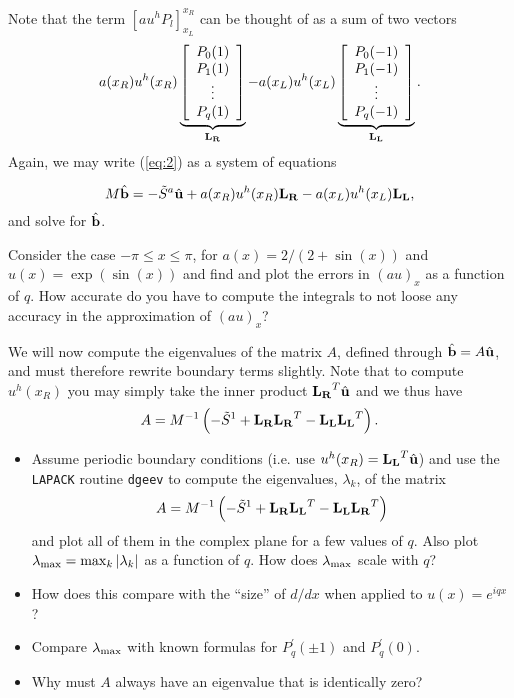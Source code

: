 \documentclass[12pt]{article}
\newcommand{\be}{\begin{equation}}
\newcommand{\ee}{\end{equation}}
\begin{document}
Note that the term $\left[au^h P_l  \right]_{x_L}^{x_R}$ can be thought of as a sum of two vectors  
\[
a(x_R) u^h(x_R) \underbrace{\left[ \begin{array}{c}
P_0(1)\\
P_1(1)\\
\vdots \\
P_q(1)
\end{array} \right]}_{{\bf L_R}} 
- a(x_L) u^h(x_L) \underbrace{\left[ \begin{array}{c}
P_0(-1)\\
P_1(-1)\\
\vdots \\
P_q(-1)
\end{array} \right]}_{{\bf L_L}}.
\]
Again, we may write (\ref{eq:2}) as a system of equations  

\[
M \hat{{\bf b}} = -\tilde{S}^a \hat{{\bf u}} + a(x_R) u^h(x_R){\bf L_R} - a(x_L) u^h(x_L){\bf L_L},
\]
and solve for $\hat{{\bf b}}$.

Consider the case $-\pi \le x \le \pi$, for  $a(x) = 2/(2+\sin(x))$ and $u(x) = \exp(\sin(x))$ and find and plot the errors in $(au)_x$ as a function of $q$. How accurate do you have to compute the integrals to not loose any accuracy in the approximation of $(au)_x$?  

We will now compute the eigenvalues of the matrix $A$, defined through $\hat{{\bf b}} = A \hat{{\bf u}}$, and must therefore rewrite boundary terms slightly. Note that to compute $u^h(x_R)$ you may simply take the inner product $ {\bf L_R}^T \hat{{\bf u}}$ and we thus have
\be
A = M^{-1} \left( -\tilde{S}^1 + {\bf L_R} {\bf L_R}^T - {\bf L_L} {\bf L_L}^T \right).
\ee

\begin{itemize}
\item Assume periodic boundary conditions (i.e. use $u^h(x_R) = {\bf L_L}^T \hat{{\bf u}}$) and use the \verb+LAPACK+ routine \verb+dgeev+ to compute the eigenvalues, $\lambda_k$, of the matrix
\be
A = M^{-1} \left( -\tilde{S}^1 + {\bf L_R} {\bf L_L}^T - {\bf L_L} {\bf L_R}^T \right)
\ee
and plot all of them in the complex plane for a few values of $q$. Also plot $\lambda_{\rm max} = \max_{k} | \lambda_k |$ as a function of $q$. How does $\lambda_{\rm max}$ scale with $q$? 
\item How does this compare with the ``size'' of $d / dx$ when applied to $u(x) = e^{iqx}$? 
\item Compare $\lambda_{\rm max}$ with known formulas for $P^\prime_q(\pm 1)$ and $P^\prime_q(0)$.
\item  Why must $A$ always have an eigenvalue that is identically zero?
\end{itemize}
\end{document}
